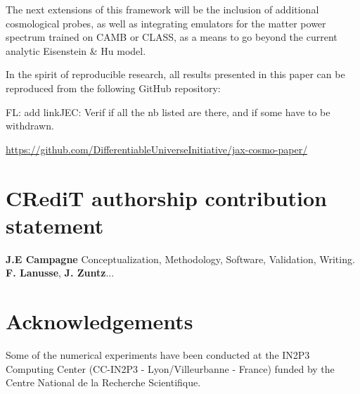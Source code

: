\documentclass[twocolumn,twocolappendix,nofootinbib,iop]{openjournal}
\newcommand{\FrL}[1]{{\color{cyan}FL: #1}}
\newcommand{\JEC}[1]{{\color{magenta}JEC: #1}}
\begin{document}
\bigskip

The next extensions of this framework will be the inclusion of additional cosmological probes, as well as integrating emulators for the matter power spectrum trained on CAMB or CLASS, as a means to go beyond the current analytic Eisenstein \& Hu model.


\bigskip

In the spirit of reproducible research, all results presented in this paper can be reproduced from the following GitHub repository:

\FrL{add link}\JEC{Verif if all the nb listed are there, and if some have to be withdrawn. } 

\url{https://github.com/DifferentiableUniverseInitiative/jax-cosmo-paper/}



%
%
%
%
%

\section*{CRediT authorship contribution statement}
\textbf{J.E Campagne} Conceptualization, Methodology, Software, Validation, Writing.
\textbf{F. Lanusse}, \textbf{J. Zuntz}...


\section*{Acknowledgements}
Some of the numerical experiments have been conducted at the IN2P3 Computing Center (CC-IN2P3 - Lyon/Villeurbanne - France) funded by the Centre National de la Recherche Scientifique.


\appendix
\end{document}

